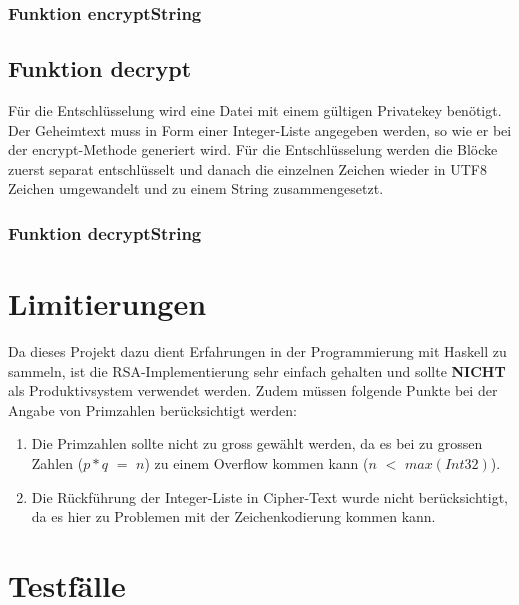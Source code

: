 \documentclass[a4paper, 11pt]{article} %
\begin{document}



\subsubsection{Funktion encryptString}



\subsection{Funktion decrypt}
Für die Entschlüsselung wird eine Datei mit einem gültigen Privatekey benötigt. Der Geheimtext muss in Form einer Integer-Liste angegeben werden, so wie er bei der encrypt-Methode generiert wird.
Für die Entschlüsselung werden die Blöcke zuerst separat entschlüsselt und danach die einzelnen Zeichen wieder in UTF8 Zeichen umgewandelt und zu einem String zusammengesetzt.

\subsubsection{Funktion decryptString}


\section{Limitierungen}
Da dieses Projekt dazu dient Erfahrungen in der Programmierung mit Haskell zu sammeln, ist die RSA-Implementierung sehr einfach gehalten und sollte \textbf{NICHT} als Produktivsystem verwendet werden. Zudem müssen folgende Punkte bei der Angabe von Primzahlen berücksichtigt werden:
\begin{enumerate}
\item Die Primzahlen sollte nicht zu gross gewählt werden, da es bei zu grossen Zahlen ($p*q$ $=$ $n$) zu einem Overflow kommen kann ($n$ $<$ $max(Int32)$).
\item Die Rückführung der Integer-Liste in Cipher-Text wurde nicht berücksichtigt, da es hier zu Problemen mit der Zeichenkodierung kommen kann.
\end{enumerate}

\section{Testfälle}
\end{document}
